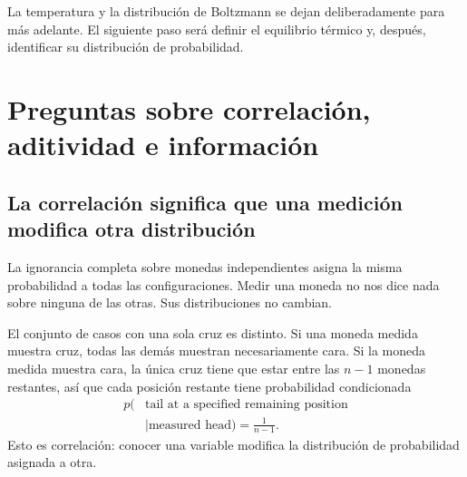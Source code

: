 \begin{classroomqa}
\end{classroomqa}

La temperatura y la distribución de Boltzmann se dejan deliberadamente para más adelante. El siguiente paso será definir el equilibrio térmico y, después, identificar su distribución de probabilidad.

\section{Preguntas sobre correlación, aditividad e información}

\subsection{La correlación significa que una medición modifica otra distribución}

La ignorancia completa sobre monedas independientes asigna la misma probabilidad a todas las configuraciones. Medir una moneda no nos dice nada sobre ninguna de las otras. Sus distribuciones no cambian.

El conjunto de casos con una sola cruz es distinto. Si una moneda medida muestra cruz, todas las demás muestran necesariamente cara. Si la moneda medida muestra cara, la única cruz tiene que estar entre las \(n-1\) monedas restantes, así que cada posición restante tiene probabilidad condicionada
\begin{equation}
\begin{aligned}
 p(&\text{tail at a specified remaining position}\\
   &\mid\text{measured head})=\frac{1}{n-1}.
\end{aligned}
 \label{eq:sm1-conditional-tail}
\end{equation}
Esto es correlación: conocer una variable modifica la distribución de probabilidad asignada a otra.

\begin{classroomqa}
\end{classroomqa}

